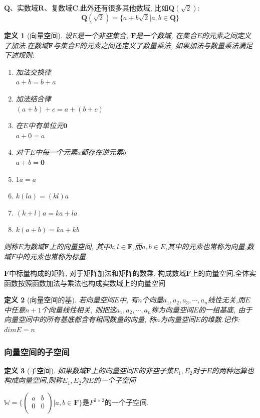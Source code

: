 \documentclass[a4paper,11pt]{article}
\newtheorem{definition}{\hspace{2em}定义}[section]
\begin{document}
$\mathbf{Q}$、实数域$\mathbf{R}$、复数域$\mathbf{C}$.此外还有很多其他数域, 比如$\mathbf{Q}(\sqrt{2})$:
\begin{equation*}
  \mathbf{Q}(\sqrt{2})=\{a+b\sqrt{2}|a,b\in\mathbf{Q}\}
\end{equation*}
\begin{definition}[向量空间]
  设$E$是一个非空集合, $\mathbf{F}$是一个数域, 在集合$E$的元素之间定义了加法.在数域$\mathbf{F}$与集合$E$的元素之间还定义了数量乘法, 如果加法与数量乘法满足下述规则:
  \begin{enumerate}[(1)]
    \item 加法交换律\\$a+b=b+a$
    \item 加法结合律\\$(a+b)+c=a+(b+c)$
    \item 在$E$中有单位元$\mathbf{0}$\\$a+0=a$
    \item 对于$E$中每一个元素$a$都存在逆元素$b$\\$a+b=\mathbf{0}$
    \item $1a=a$
    \item $k(la)=(kl)a$
    \item $(k+l)a=ka+la$
    \item $k(a+b)=ka+kb$
  \end{enumerate}
  则称$E$为数域$\mathbf{F}$上的向量空间, 其中$k,l\in \mathbf{F}$,而$a,b\in E$,其中的元素也常称为向量,数域$F$中的元素也常称为标量.
\end{definition}
$\mathbf{F}$中标量构成的矩阵, 对于矩阵加法和矩阵的数乘, 构成数域$\mathbf{F}$上的向量空间.全体实函数按照函数加法与乘法也构成实数域上的向量空间
\begin{definition}[向量空间的基]
  若向量空间$E$中, 有$n$个向量$a_1,a_2,a_3,\cdots,a_n$线性无关,而$E$中任意$n+1$个向量线性相关, 则把这$a_1,a_2,\cdots,a_n$称为向量空间$E$的一组基底, 由于向量空间中的所有基底都含有相同数量的向量, 称$n$为向量空间$E$的维数.记作:$dimE=n$
\end{definition}
\subsubsection*{向量空间的子空间}
\begin{definition}[子空间]
  如果数域$\mathbf{F}$上的向量空间$E$的非空子集$E_1,E_2$对于$E$的两种运算也构成向量空间,则称$E_1,E_2$为$E$的一个子空间
\end{definition}
$\mathbb{W}=\{\begin{pmatrix}
                       a & b \\
                       0 & 0 \\
                     \end{pmatrix}
|a,b\in \mathbf{F}\}$是$F^{2\times 2}$的一个子空间.
\end{document}
